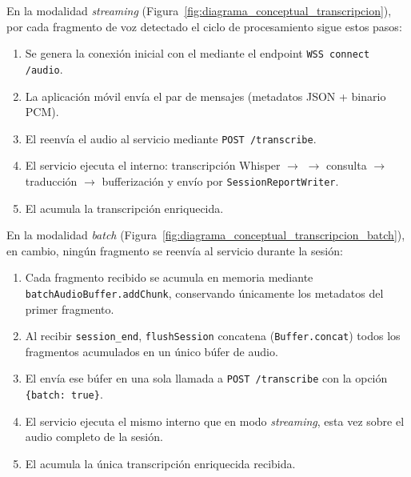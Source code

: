 

En la modalidad \textit{streaming} (Figura~\ref{fig:diagrama_conceptual_transcripcion}), por cada
fragmento de voz detectado el ciclo de procesamiento sigue estos pasos:

\begin{enumerate}
    \item Se genera la conexión inicial con el  mediante el endpoint
    \texttt{WSS connect /audio}.
    \item La aplicación móvil envía el par de mensajes  (metadatos JSON +
    binario PCM).
    \item El  reenvía el audio al servicio  mediante
    \texttt{POST /transcribe}.
    \item El servicio  ejecuta el  interno: transcripción
    Whisper $\rightarrow$  $\rightarrow$ consulta 
    $\rightarrow$ traducción  $\rightarrow$ bufferización y envío por
    \texttt{SessionReportWriter}.
    \item El  acumula la transcripción enriquecida.
\end{enumerate}

En la modalidad \textit{batch} (Figura~\ref{fig:diagrama_conceptual_transcripcion_batch}), en cambio,
ningún fragmento se reenvía al servicio  durante la sesión:

\begin{enumerate}
    \item Cada fragmento recibido se acumula en memoria mediante \texttt{batchAudioBuffer.addChunk},
    conservando únicamente los metadatos del primer fragmento.
    \item Al recibir \texttt{session\_end}, \texttt{flushSession} concatena
    (\texttt{Buffer.concat}) todos los fragmentos acumulados en un único búfer de audio.
    \item El  envía ese búfer en una sola llamada a \texttt{POST /transcribe}
    con la opción \texttt{\{batch: true\}}.
    \item El servicio  ejecuta el mismo  interno que en modo
    \textit{streaming}, esta vez sobre el audio completo de la sesión.
    \item El  acumula la única transcripción enriquecida recibida.
\end{enumerate}

